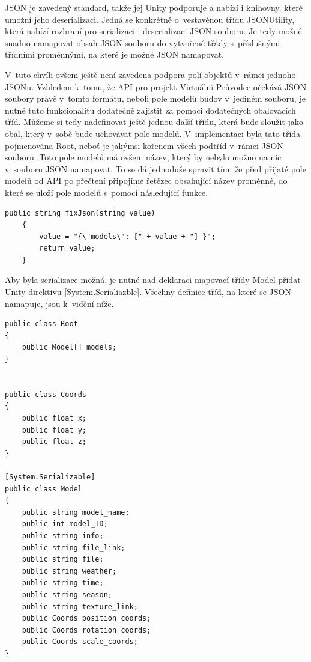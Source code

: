 \documentclass[thesis=B,czech]{FITthesis}[2012/06/26]
\begin{document}
	 JSON je zavedený standard, takže jej Unity podporuje a nabízí i knihovny, které umožní jeho deserializaci. Jedná se konkrétně o~vestavěnou třídu JSONUtility, která nabízí rozhraní pro serializaci i deserializaci JSON souboru. Je tedy možné snadno namapovat obsah JSON souboru do vytvořené třády s~příslušnými třídními proměnnými, na které je možné JSON namapovat. \cite{UnityJSON}

V~tuto chvíli ovšem ještě není zavedena podpora polí objektů v~rámci jednoho JSONu. \cite{UnityJSON} Vzhledem k~tomu, že API pro projekt Virtuální Průvodce očekává JSON soubory právě v~tomto formátu, neboli pole modelů budov v~jediném souboru, je nutné tuto funkcionalitu dodatečně zajistit za pomoci dodatečných obalovacích tříd. Můžeme si tedy nadefinovat ještě jednou další třídu, která bude sloužit jako obal, který v~sobě bude uchovávat pole modelů. V~implementaci byla tato třída pojmenována Root, neboť je jakýmsi kořenem všech podtříd v~rámci JSON souboru. Toto pole modelů má ovšem název, který by nebylo možno na nic v~souboru JSON namapovat. To se dá jednoduše spravit tím, že před přijaté pole modelů od API po přečtení připojíme řetězec obsahující název proměnné, do které se uloží pole modelů s~pomocí následující funkce.

\begin{lstlisting}[frame=single]
public string fixJson(string value)
    {
        value = "{\"models\": [" + value + "] }";
        return value;
    }

\end{lstlisting}

Aby byla serializace možná, je nutné nad deklaraci mapovací třídy Model přidat Unity direktivu [System.Serialiazble]. Všechny definice tříd, na které se JSON namapuje, jsou k~vidění níže. 

\begin{lstlisting}[frame=single]
public class Root
{
    public Model[] models;
}


public class Coords 
{
    public float x;
    public float y;
    public float z;
}

[System.Serializable]
public class Model
{
    public string model_name;
    public int model_ID;
    public string info;
    public string file_link;
    public string file;
    public string weather;
    public string time;
    public string season;
    public string texture_link;
    public Coords position_coords;
    public Coords rotation_coords;
    public Coords scale_coords;
}
\end{lstlisting}
\end{document}
